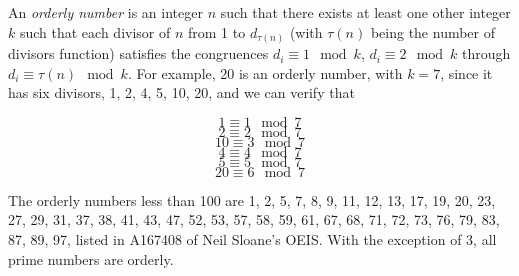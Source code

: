 \documentclass[12pt]{article}
\begin{document}
An {\em orderly number} is an integer $n$ such that there exists at least one other integer $k$ such that each divisor of $n$ from 1 to $d_{\tau(n)}$ (with $\tau(n)$ being the number of divisors function) satisfies the congruences $d_i \equiv 1 \mod k$, $d_i \equiv 2 \mod k$ through $d_i \equiv \tau(n) \mod k$. For example, 20 is an orderly number, with $k = 7$, since it has six divisors, 1, 2, 4, 5, 10, 20, and we can verify that

$$1 \equiv 1 \mod 7$$
$$2 \equiv 2 \mod 7$$
$$10 \equiv 3 \mod 7$$
$$4 \equiv 4 \mod 7$$
$$5 \equiv 5 \mod 7$$
$$20 \equiv 6 \mod 7$$

The orderly numbers less than 100 are 1, 2, 5, 7, 8, 9, 11, 12, 13, 17, 19, 20, 23, 27, 29, 31, 37, 38, 41, 43, 47, 52, 53, 57, 58, 59, 61, 67, 68, 71, 72, 73, 76, 79, 83, 87, 89, 97, listed in A167408 of Neil Sloane's OEIS. With the exception of 3, all prime numbers are orderly.
\end{document}
